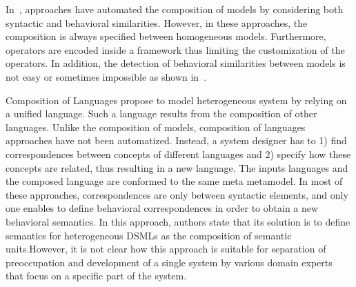 In~\cite{compostatechartsbib,weavingbib}, approaches have automated the composition of models by considering both syntactic and behavioral similarities. However, in these approaches, the composition is always specified between homogeneous models. Furthermore, operators are encoded inside a framework thus limiting the customization of the operators. In addition, the detection of behavioral similarities between models is not easy or sometimes impossible as shown in~\cite{?}. 

Composition of Languages propose to model heterogeneous system by relying on a unified language. Such a language results from the composition of other languages. Unlike the composition of models, composition of languages approaches have not been automatized. Instead, a system designer has to 1) find correspondences between concepts of different languages and 2) specify how these concepts are related, thus resulting in a new language. The inputs languages and the composed language are conformed to the same meta metamodel. In most of these approaches, correspondences are only between syntactic elements, and only one enables to define behavioral correspondences in order to obtain a new behavioral semantics. In this approach, authors state that its solution is to define semantics for heterogeneous DSMLs as the composition of semantic units.However, it is not clear how this approach is suitable for separation of preoccupation and development of a single system by various domain experts that focus on a specific part of the system. 
